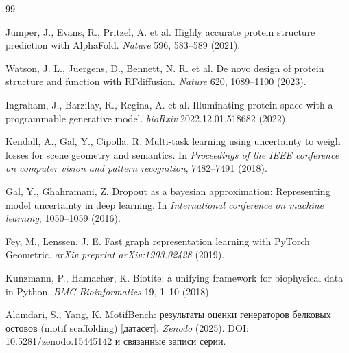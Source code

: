\documentclass[12pt, a4paper]{article}
\begin{document}
\begin{thebibliography}{99}

Jumper, J., Evans, R., Pritzel, A. et al. Highly accurate protein structure prediction with AlphaFold. \textit{Nature} 596, 583–589 (2021).

Watson, J. L., Juergens, D., Bennett, N. R. et al. De novo design of protein structure and function with RFdiffusion. \textit{Nature} 620, 1089–1100 (2023).

Ingraham, J., Barzilay, R., Regina, A. et al. Illuminating protein space with a programmable generative model. \textit{bioRxiv} 2022.12.01.518682 (2022).

Kendall, A., Gal, Y., Cipolla, R. Multi-task learning using uncertainty to weigh losses for scene geometry and semantics. In \textit{Proceedings of the IEEE conference on computer vision and pattern recognition}, 7482–7491 (2018).

Gal, Y., Ghahramani, Z. Dropout as a bayesian approximation: Representing model uncertainty in deep learning. In \textit{International conference on machine learning}, 1050–1059 (2016).

Fey, M., Lenssen, J. E. Fast graph representation learning with PyTorch Geometric. \textit{arXiv preprint arXiv:1903.02428} (2019).

Kunzmann, P., Hamacher, K. Biotite: a unifying framework for biophysical data in Python. \textit{BMC Bioinformatics} 19, 1–10 (2018).

Alamdari, S., Yang, K. MotifBench: результаты оценки генераторов белковых остовов (motif scaffolding) [датасет]. \textit{Zenodo} (2025). DOI: 10.5281/zenodo.15445142 и связанные записи серии.

\end{thebibliography}
\end{document}
